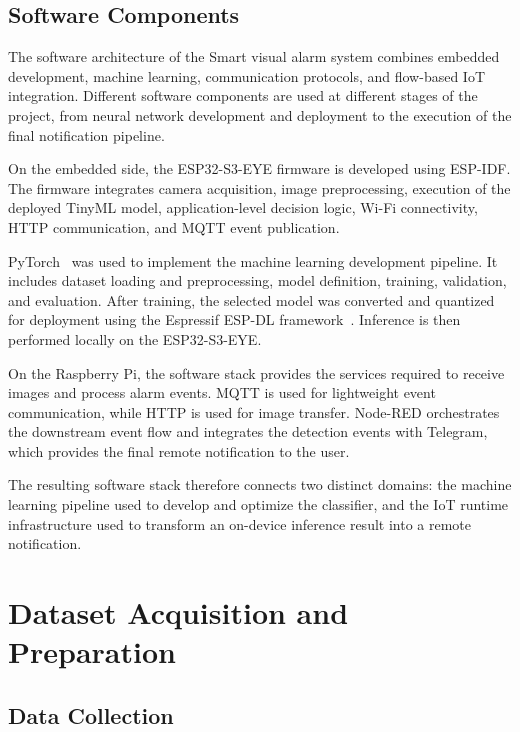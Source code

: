 \documentclass{article}
\begin{document}
\subsection{Software Components}
\label{subsec:software-components}

The software architecture of the Smart visual alarm system combines
embedded development, machine learning, communication protocols, and
flow-based IoT integration. Different software components are used at
different stages of the project, from neural network development and
deployment to the execution of the final notification pipeline.

On the embedded side, the ESP32-S3-EYE firmware is developed using
ESP-IDF. The firmware integrates camera acquisition, image preprocessing,
execution of the deployed TinyML model, application-level decision logic,
Wi-Fi connectivity, HTTP communication, and MQTT event publication.

PyTorch~\cite{paszke2019pytorch} was used to implement the machine learning
development pipeline. It includes dataset loading and preprocessing, model
definition, training, validation, and evaluation. After training, the 
selected model was converted and quantized for deployment using the Espressif 
ESP-DL framework~\cite{espressif_espdl}. Inference is then performed locally on 
the ESP32-S3-EYE.

On the Raspberry Pi, the software stack provides the services required to
receive images and process alarm events. MQTT is used for lightweight
event communication, while HTTP is used for image transfer. Node-RED
orchestrates the downstream event flow and integrates the detection events
with Telegram, which provides the final remote notification to the user.

The resulting software stack therefore connects two distinct domains:
the machine learning pipeline used to develop and optimize the classifier,
and the IoT runtime infrastructure used to transform an on-device inference
result into a remote notification.

\section{Dataset Acquisition and Preparation}
\label{sec:dataset}

\subsection{Data Collection}
\label{subsec:data-collection}
\end{document}
